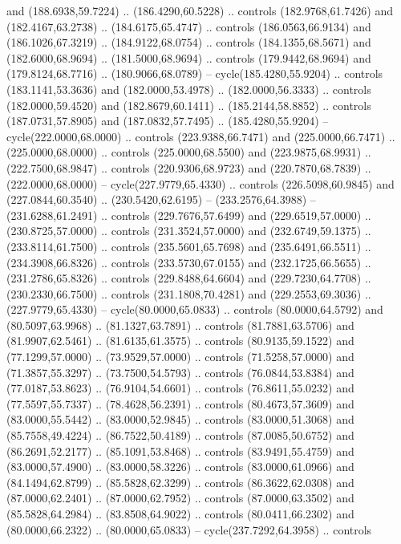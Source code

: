   and (188.6938,59.7224) .. (186.4290,60.5228) .. controls (182.9768,61.7426)
  and (182.4167,63.2738) .. (184.6175,65.4747) .. controls (186.0563,66.9134)
  and (186.1026,67.3219) .. (184.9122,68.0754) .. controls (184.1355,68.5671)
  and (182.6000,68.9694) .. (181.5000,68.9694) .. controls (179.9442,68.9694)
  and (179.8124,68.7716) .. (180.9066,68.0789) -- cycle(185.4280,55.9204) ..
  controls (183.1141,53.3636) and (182.0000,53.4978) .. (182.0000,56.3333) ..
  controls (182.0000,59.4520) and (182.8679,60.1411) .. (185.2144,58.8852) ..
  controls (187.0731,57.8905) and (187.0832,57.7495) .. (185.4280,55.9204) --
  cycle(222.0000,68.0000) .. controls (223.9388,66.7471) and (225.0000,66.7471)
  .. (225.0000,68.0000) .. controls (225.0000,68.5500) and (223.9875,68.9931) ..
  (222.7500,68.9847) .. controls (220.9306,68.9723) and (220.7870,68.7839) ..
  (222.0000,68.0000) -- cycle(227.9779,65.4330) .. controls (226.5098,60.9845)
  and (227.0844,60.3540) .. (230.5420,62.6195) -- (233.2576,64.3988) --
  (231.6288,61.2491) .. controls (229.7676,57.6499) and (229.6519,57.0000) ..
  (230.8725,57.0000) .. controls (231.3524,57.0000) and (232.6749,59.1375) ..
  (233.8114,61.7500) .. controls (235.5601,65.7698) and (235.6491,66.5511) ..
  (234.3908,66.8326) .. controls (233.5730,67.0155) and (232.1725,66.5655) ..
  (231.2786,65.8326) .. controls (229.8488,64.6604) and (229.7230,64.7708) ..
  (230.2330,66.7500) .. controls (231.1808,70.4281) and (229.2553,69.3036) ..
  (227.9779,65.4330) -- cycle(80.0000,65.0833) .. controls (80.0000,64.5792) and
  (80.5097,63.9968) .. (81.1327,63.7891) .. controls (81.7881,63.5706) and
  (81.9907,62.5461) .. (81.6135,61.3575) .. controls (80.9135,59.1522) and
  (77.1299,57.0000) .. (73.9529,57.0000) .. controls (71.5258,57.0000) and
  (71.3857,55.3297) .. (73.7500,54.5793) .. controls (76.0844,53.8384) and
  (77.0187,53.8623) .. (76.9104,54.6601) .. controls (76.8611,55.0232) and
  (77.5597,55.7337) .. (78.4628,56.2391) .. controls (80.4673,57.3609) and
  (83.0000,55.5442) .. (83.0000,52.9845) .. controls (83.0000,51.3068) and
  (85.7558,49.4224) .. (86.7522,50.4189) .. controls (87.0085,50.6752) and
  (86.2691,52.2177) .. (85.1091,53.8468) .. controls (83.9491,55.4759) and
  (83.0000,57.4900) .. (83.0000,58.3226) .. controls (83.0000,61.0966) and
  (84.1494,62.8799) .. (85.5828,62.3299) .. controls (86.3622,62.0308) and
  (87.0000,62.2401) .. (87.0000,62.7952) .. controls (87.0000,63.3502) and
  (85.5828,64.2984) .. (83.8508,64.9022) .. controls (80.0411,66.2302) and
  (80.0000,66.2322) .. (80.0000,65.0833) -- cycle(237.7292,64.3958) .. controls
